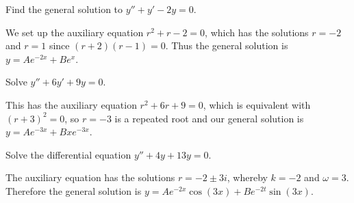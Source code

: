 \begin{example}
	Find the general solution to $y'' + y' - 2y = 0$.

	We set up the auxiliary equation $r^2 + r - 2 = 0$, which has the solutions $r = -2$ and $r = 1$ since $(r + 2)(r - 1) = 0$. Thus the general solution is $y = A e^{-2 x} + B e^{x}$.
\end{example}

\begin{example}
	Solve $y'' + 6 y' + 9 y = 0$.

	This has the auxiliary equation $r^2 + 6 r + 9 = 0$, which is equivalent with $(r + 3)^2 = 0$, so $r = -3$ is a repeated root and our general solution is $y = A e^{-3x} + B x e^{-3x}$.
\end{example}

\begin{example}
	Solve the differential equation $y'' + 4 y + 13 y = 0$.

	The auxiliary equation has the solutions $r = -2 \pm 3 i$, whereby $k = -2$ and $\omega = 3$. Therefore the general solution is $y = A e^{-2 x} \cos(3 x) + B e^{-2 t} \sin(3 x)$. 
\end{example}
